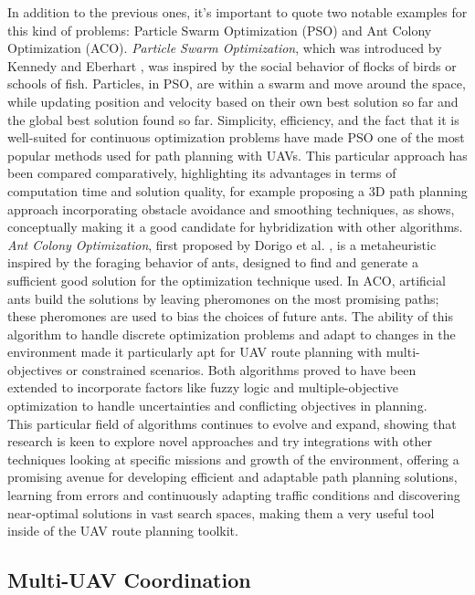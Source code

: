 \documentclass[conference]{IEEEtran}
\begin{document}
In addition to the previous ones, it's important to quote two notable examples for this kind of problems: Particle Swarm Optimization (PSO) and Ant Colony Optimization (ACO). \textit{Particle Swarm Optimization}, which was introduced by Kennedy and Eberhart \cite{pso}, was inspired by the social behavior of flocks of birds or schools of fish. Particles, in PSO, are within a swarm and move around the space, while updating position and velocity based on their own best solution so far and the global best solution found so far. Simplicity, efficiency, and the fact that it is well-suited for continuous optimization problems have made PSO one of the most popular methods used for path planning with UAVs. This particular approach has been compared comparatively, highlighting its advantages in terms of computation time and solution quality, for example proposing a 3D path planning approach incorporating obstacle avoidance and smoothing techniques, as \cite{pso_3d} shows, conceptually making it a good candidate for hybridization with other algorithms. \textit{Ant Colony Optimization}, first proposed by Dorigo et al. \cite{aco}, is a metaheuristic inspired by the foraging behavior of ants, designed to find and generate a sufficient good solution for the optimization technique used. In ACO, artificial ants build the solutions by leaving pheromones on the most promising paths; these pheromones are used to bias the choices of future ants. The ability of this algorithm to handle discrete optimization problems and adapt to changes in the environment made it particularly apt for UAV route planning with multi-objectives or constrained scenarios. Both algorithms proved to have been extended to incorporate factors like fuzzy logic and multiple-objective optimization to handle uncertainties and conflicting objectives in planning. \\

This particular field of algorithms continues to evolve and expand, showing that research is keen to explore novel approaches and try integrations with other techniques looking at specific missions and growth of the environment, offering a promising avenue for developing efficient and adaptable path planning solutions, learning from errors and continuously adapting traffic conditions and discovering near-optimal solutions in vast search spaces, making them a very useful tool inside of the UAV route planning toolkit.

\subsection{Multi-UAV Coordination}
\end{document}
